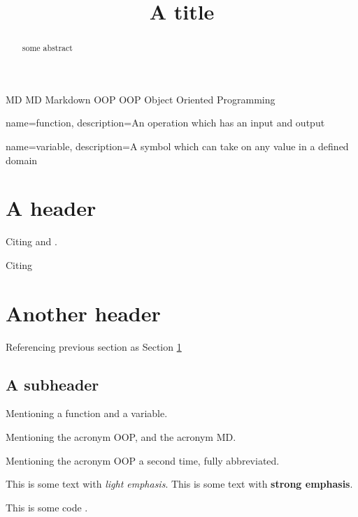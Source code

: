 \documentclass[a4paper, ]{article}
\title{A title}
\begin{document}
    \maketitle
    
    \begin{abstract}
    some abstract
    \end{abstract}
    \clearpage

    \tableofcontents
    \clearpage
    
    \newacronym
        {MD}
        {MD}
        {Markdown}
    \newacronym
        {OOP}
        {OOP}
        {Object Oriented Programming}

    {
        name=function,
        description={An operation which has an input and output}
    }

    {
        name=variable,
        description={A symbol which can take on any value in a defined domain}
    }

    \section{A header}
    \label{sec:my-header}

    Citing \cite{an-online-resource} and \cite{another-online-resource}.

    Citing \cite{a-book}

    \section{Another header}
    \label{another-header}

    Referencing previous section as Section \ref{sec:my-header}

    \subsection{A subheader}
    \label{a-subheader}

    Mentioning a \gls{function} and a \gls{variable}.

    Mentioning the acronym \gls{OOP}, and the acronym \gls{MD}.

    Mentioning the acronym \gls{OOP} a second time, fully abbreviated.

    This is some text with \textit{light emphasis}. This is some text
    with \textbf{strong emphasis}.

    This is some code .
\end{document}
